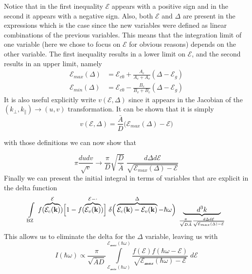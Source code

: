 Notice that in the first inequality $\mathcal{E}$ appears with a positive sign and in the second it appears with a negative sign. Also, both $\mathcal{E}$ and $\Delta$ are present in the expressions which is the case since the new variables were defined as linear combinations of the previous variables. This means that the integration limit of one variable (here we chose to focus on $\mathcal{E}$ for obvious reasons) depends on the other variable. The first inequality results in a lower limit on $\mathcal{E}$, and the second results in an upper limit, namely
\begin{align}
\mathcal{E}_{max}(\Delta) &= \mathcal{E}_{c 0 } + \frac{A_{c}}{A_{c} + A_{v}}(\Delta - \mathcal{E}_{g}) \\
\mathcal{E}_{min}(\Delta) &= \mathcal{E}_{c 0 } - \frac{B_{c}}{B_{v} + B_{c}}(\Delta - \mathcal{E}_{g})
\label{eq:quadratic_interband_energy_limits}
\end{align}
It is also useful explicitly write $v(\mathcal{E}, \Delta)$ since it appears in the Jacobian of the $(k_{\perp},k_{\parallel})\to(u,v)$ transformation. It can be shown that it is simply
\begin{equation}
v(\mathcal{E}, \Delta) = \frac{\bar{A}}{D}\Big(\mathcal{E}_{max}(\Delta)-\mathcal{E}\Big)
\label{eq:quadratic_interband_v_expression}
\end{equation}

with those definitions we can now show that

\begin{equation}
\pi \frac{dudv}{\sqrt{ v }} \to \frac{\pi}{D} \sqrt{ \frac{D}{\bar{A}} }\; \frac{d\Delta d\mathcal{E}}{\sqrt{ \mathcal{E}_{max}(\Delta)-\mathcal{E} }}
\label{eq:quadratic_interband_jacobian_transform}
\end{equation}
Finally we can present the initial integral in terms of variables that are explicit in the delta function
\begin{equation}
\int\limits_{\text{BZ}}  \; f(\overbrace{ \mathcal{E}_{c}(\mathbf{k}) }^{ \mathcal{E} }) \Big[1-f(\overbrace{ \mathcal{E}_{v}(\mathbf{k}) }^{\mathcal{E-\Delta}})\Big] \; \delta\Big(\overbrace{ \mathcal{E}_{c}(\mathbf{k}) - \mathcal{E}_{v}(\mathbf{k}) }^{ \Delta } - \hbar\omega  \Big) \; \underbrace{ \quad\quad d^{3}k \quad\quad }_{\Large \frac{\pi}{\sqrt{ D \bar{A} }}  \frac{d\Delta d\mathcal{E}}{ \sqrt{ \mathcal{E}_{max}(\Delta)-\mathcal{E} }} }
\label{eq:quadratic_interband_overbrace}
\end{equation}
This allows us to eliminate the delta for the $\Delta$ variable, leaving us with
\begin{equation}
\boxed{I(\hbar\omega)\propto \frac{\pi}{ \sqrt{ \overline{A}D }}
\int\limits_{\mathcal{E_{min}(\hbar \omega)}}^{\mathcal{E_{max}(\hbar \omega)}} \frac{{f(\mathcal{E})f(\hbar\omega-\mathcal{E})}}{\sqrt{ \mathcal{E_{max}(\hbar\omega)}-\mathcal{E} }} \; d\mathcal{E}}
\label{eq:quadratic_interband_final_boxed}
\end{equation}
